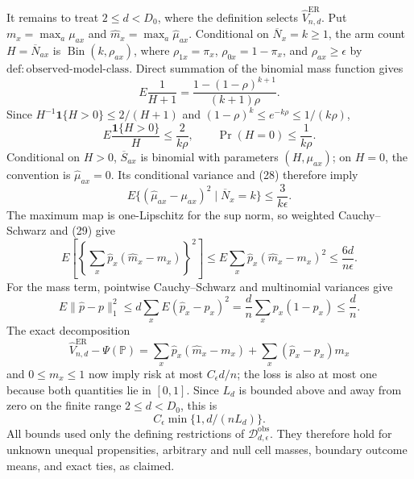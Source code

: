 It remains to treat \(2\leq d<D_0\), where the definition selects \(\widehat V_{n,d}^{\mathrm{ER}}\).  Put \(m_x=\max_a\mu_{ax}\) and \(\widehat m_x=\max_a\widehat\mu_{ax}\).  Conditional on \(\overline N_x=k\geq1\), the arm count \(H=\overline N_{ax}\) is \(\operatorname{Bin}(k,\rho_{ax})\), where \(\rho_{1x}=\pi_x\), \(\rho_{0x}=1-\pi_x\), and \(\rho_{ax}\geq\epsilon\) by \(\mathrm{def:observed\text{-}model\text{-}class}\).  Direct summation of the binomial mass function gives
\[
 E\frac1{H+1}=\frac{1-(1-\rho)^{k+1}}{(k+1)\rho}.
\]
Since \(H^{-1}\mathbf1\{H>0\}\leq2/(H+1)\) and
\((1-\rho)^k\leq e^{-k\rho}\leq1/(k\rho)\),
\[
 E\frac{\mathbf1\{H>0\}}H\leq\frac2{k\rho},
 \qquad \Pr(H=0)\leq\frac1{k\rho}.
 \tag{28}
\]
Conditional on \(H>0\), \(\overline S_{ax}\) is binomial with parameters \((H,\mu_{ax})\); on \(H=0\), the convention is \(\widehat\mu_{ax}=0\).  Its conditional variance and (28) therefore imply
\[
 E\{(\widehat\mu_{ax}-\mu_{ax})^2\mid\overline N_x=k\}
 \leq\frac3{k\epsilon}.
 \tag{29}
\]
The maximum map is one-Lipschitz for the sup norm, so weighted Cauchy--Schwarz and (29) give
\[
 E\left[
 \left\{\sum_x\widehat p_x(\widehat m_x-m_x)\right\}^2
 \right]
 \leq E\sum_x\widehat p_x(\widehat m_x-m_x)^2
 \leq\frac{6d}{n\epsilon}.
 \tag{30}
\]
For the mass term, pointwise Cauchy--Schwarz and multinomial variances give
\[
 E\lVert\widehat p-p\rVert_1^2
 \leq d\sum_xE(\widehat p_x-p_x)^2
 =\frac d n\sum_xp_x(1-p_x)\leq\frac d n.
 \tag{31}
\]
The exact decomposition
\[
 \widehat V_{n,d}^{\mathrm{ER}}-\Psi(\mathbb P)
 =\sum_x\widehat p_x(\widehat m_x-m_x)
 +\sum_x(\widehat p_x-p_x)m_x
\]
and \(0\leq m_x\leq1\) now imply risk at most \(C_\epsilon d/n\); the loss is also at most one because both quantities lie in \([0,1]\).  Since \(L_d\) is bounded above and away from zero on the finite range \(2\leq d<D_0\), this is
\[
 C_\epsilon\min\{1,d/(nL_d)\}.
\]
All bounds used only the defining restrictions of \(\mathcal D_{d,\epsilon}^{\mathrm{obs}}\).  They therefore hold for unknown unequal propensities, arbitrary and null cell masses, boundary outcome means, and exact ties, as claimed.